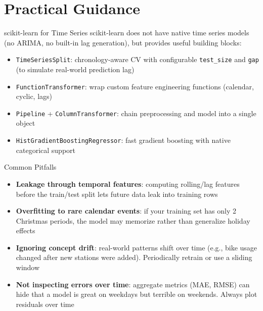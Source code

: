 \documentclass[11pt,compress,t,notes=noshow, xcolor=table]{beamer}
\begin{document}
\section{Practical Guidance}
\begin{vbframe}{scikit-learn for Time Series}
\vfill
scikit-learn does not have native time series models (no ARIMA, no built-in lag generation), but provides useful building blocks:
\vfill
\begin{itemize}
    \item \texttt{TimeSeriesSplit}: chronology-aware CV with configurable \texttt{test\_size} and \texttt{gap} (to simulate real-world prediction lag)
    \item \texttt{FunctionTransformer}: wrap custom feature engineering functions (calendar, cyclic, lags)
    \item \texttt{Pipeline} + \texttt{ColumnTransformer}: chain preprocessing and model into a single object
    \item \texttt{HistGradientBoostingRegressor}: fast gradient boosting with native categorical support
\end{itemize}
\vfill
\end{vbframe}


\begin{vbframe}{Common Pitfalls}
\vfill
\begin{itemize}
    \item \textbf{Leakage through temporal features}: computing rolling/lag features before the train/test split lets future data leak into training rows
    \item \textbf{Overfitting to rare calendar events}: if your training set has only 2 Christmas periods, the model may memorize rather than generalize holiday effects
    \item \textbf{Ignoring concept drift}: real-world patterns shift over time (e.g., bike usage changed after new stations were added). Periodically retrain or use a sliding window
    \item \textbf{Not inspecting errors over time}: aggregate metrics (MAE, RMSE) can hide that a model is great on weekdays but terrible on weekends. Always plot residuals over time
\end{itemize}
\vfill
\end{vbframe}


\end{document}

